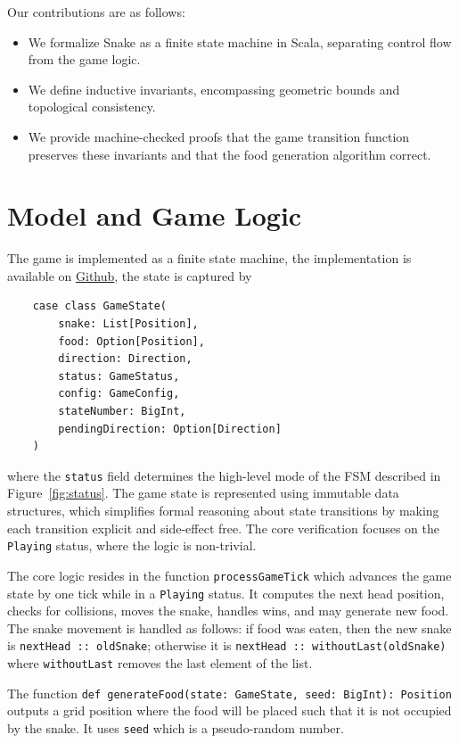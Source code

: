 \documentclass[letterpaper, 11pt]{article}
\begin{document}
Our contributions are as follows:
\begin{itemize}
    \item We formalize Snake as a finite state machine in Scala, separating control flow from the
        game logic.
    \item We define inductive invariants, encompassing geometric bounds and topological consistency.
    \item We provide machine-checked proofs that the game transition function preserves these
        invariants and that the food generation algorithm correct.
\end{itemize}


\section{Model and Game Logic}
The game is implemented as a finite state machine, the implementation is available on 
\href{https://github.com/mohamedtahaguelzim/formal-snake}{Github}, the state is captured by
\begin{verbatim}
    case class GameState(
        snake: List[Position],
        food: Option[Position],
        direction: Direction,
        status: GameStatus,
        config: GameConfig,
        stateNumber: BigInt,
        pendingDirection: Option[Direction]
    )
\end{verbatim}
where the \texttt{status} field determines the high-level mode of the FSM described in
Figure~\ref{fig:status}.
The game state is represented using immutable data structures, which simplifies formal reasoning
about state transitions by making each transition explicit and side-effect free.
The core verification focuses on the \texttt{Playing} status, where the logic is
non-trivial.

The core logic resides in the function \texttt{processGameTick} which advances the game
state by one tick while in a \texttt{Playing} status.
It computes the next head position, checks for collisions, moves the snake, handles wins, and may
generate new food. The snake movement is handled as follows: if food was eaten, then the new snake is
\texttt{nextHead :: oldSnake}; otherwise it is \newline
\texttt{nextHead :: withoutLast(oldSnake)} where \texttt{withoutLast} removes the last
element of the list.

The function \texttt{def generateFood(state: GameState, seed: BigInt): Position} outputs
a grid position where the food will be placed such that it is not occupied by the snake. It uses
\texttt{seed} which is a pseudo-random number.
\end{document}
